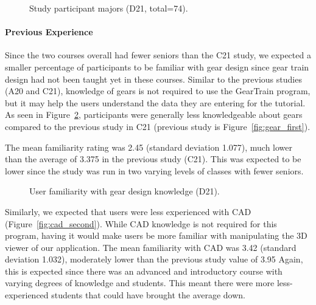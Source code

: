 \begin{doublespace}
\begin{figure}[htbp]
    \centering
    \caption{Study participant majors (D21, total=74).}
    \label{fig:majors_second}
\end{figure}

\paragraph{Previous Experience}
Since the two courses overall had fewer seniors than the C21 study, we expected a smaller percentage of participants to be familiar with gear design since gear train design had not been taught yet in these courses. Similar to the previous studies (A20 and C21), knowledge of gears is not required to use the GearTrain program, but it may help the users understand the data they are entering for the tutorial. As seen in Figure~\ref{fig:gear_second}, participants were generally less knowledgeable about gears compared to the previous study in C21 (previous study is Figure~\ref{fig:gear_first}).

The mean familiarity rating was 2.45 (standard deviation 1.077), much lower than the average of 3.375 in the previous study (C21). This was expected to be lower since the study was run in two varying levels of classes with fewer seniors.

\begin{figure}[htbp]
    \centering
    \caption{User familiarity with gear design knowledge (D21).}
    \label{fig:gear_second}
\end{figure}

Similarly, we expected that users were less experienced with CAD (Figure~\ref{fig:cad_second}). While CAD knowledge  is not required for this program, having it would make users be more familiar with manipulating the 3D viewer of our application.  The mean familiarity with CAD was 3.42 (standard deviation 1.032), moderately lower than the previous study value of 3.95 Again, this is expected since there was an advanced and introductory course with varying degrees of knowledge and students. This meant there were more less-experienced students that could have brought the average down.


\end{doublespace}
